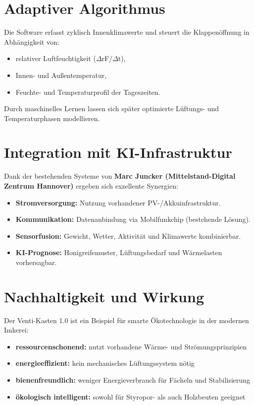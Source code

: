 \documentclass[11pt,a4paper]{article}
\begin{document}
\section{Adaptiver Algorithmus}
Die Software erfasst zyklisch Innenklimawerte und steuert die Klappenöffnung in Abhängigkeit von:
\begin{itemize}[topsep=2pt]
  \item relativer Luftfeuchtigkeit ($\Delta$rF/$\Delta$t),
  \item Innen- und Außentemperatur,
  \item Feuchte- und Temperaturprofil der Tageszeiten.
\end{itemize}
Durch maschinelles Lernen lassen sich später optimierte Lüftungs- und Temperaturphasen modellieren.

\section{Integration mit KI-Infrastruktur}
Dank der bestehenden Systeme von \textbf{Marc Juncker (Mittelstand-Digital Zentrum Hannover)} ergeben sich exzellente Synergien:
\begin{itemize}[topsep=2pt]
  \item \textbf{Stromversorgung:} Nutzung vorhandener PV-/Akkuinfrastruktur.
  \item \textbf{Kommunikation:} Datenanbindung via Mobilfunkchip (bestehende Lösung).
  \item \textbf{Sensorfusion:} Gewicht, Wetter, Aktivität und Klimawerte kombinierbar.
  \item \textbf{KI-Prognose:} Honigreifemuster, Lüftungsbedarf und Wärmelasten vorhersagbar.
\end{itemize}

\section{Nachhaltigkeit und Wirkung}
Der Venti-Kasten 1.0 ist ein Beispiel für smarte Ökotechnologie in der modernen Imkerei:
\begin{itemize}[topsep=2pt]
  \item \textbf{ressourcenschonend:} nutzt vorhandene Wärme- und Strömungsprinzipien
  \item \textbf{energieeffizient:} kein mechanisches Lüftungssystem nötig
  \item \textbf{bienenfreundlich:} weniger Energieverbrauch für Fächeln und Stabilisierung
  \item \textbf{ökologisch intelligent:} sowohl für Styropor- als auch Holzbeuten geeignet
\end{itemize}
\end{document}
